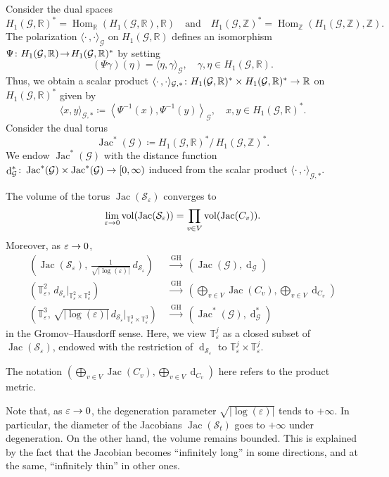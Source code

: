 \documentclass[AHL,Unicode,longabstracts]{cedram}
\newcommand{\innone}[2]{{\langle#2\rangle_{#1}}}
\newcommand{\binnone}[2]{{\left\langle#2\right\rangle_{#1}}}
\newcommand{\rest}[1]{\vert_{#1}}
\newcommand{\rquot}[2]{#1/\,#2}
\DeclareMathOperator{\Hom}{Hom}
\DeclareMathOperator{\Jac}{Jac}
\DeclareMathOperator{\vol}{vol}
\DeclareMathOperator{\dist}{d}
\newcommand{\R}{\mathbb{R}}
\newcommand{\Z}{\mathbb{Z}}
\newcommand{\T}{\mathbb{T}}
\newcommand{\mgr}{\mathcal{G}}
\newcommand{\rsf}{\mathcal{S}}
\newcommand{\GH}{\mathrm{GH}}
\renewcommand*{\to}{\mathchoice{\longrightarrow}{\rightarrow}{\rightarrow}{\rightarrow}}
\begin{document}
Consider the dual spaces
\[
H_1(\mgr, \R)^\ast = \Hom_\R(H_1(\mgr, \R), \R) \quad\text{and}\quad H_1(\mgr , \Z)^\ast = \Hom_\Z(H_1(\mgr, \Z), \Z).
\]
The polarization $\innone{\mgr}{\cdot \,, \cdot}$ on $H_1(\mgr, \R)$ defines an isomorphism $\Psi \colon H_1(\mgr, \R)\! \to\! H_1(\mgr, \R)^\ast$ by setting
\[
(\Psi\gamma)(\eta) = \innone{\mgr}{\eta, \gamma}, \quad \gamma, \eta\in H_1(\mgr, \R).
\]
Thus, we obtain a scalar product $\innone{\mgr, \ast}{\cdot \,, \cdot} \colon H_1(\mgr, \R)^\ast \times H_1(\mgr, \R)^\ast \to \R$ on $H_1(\mgr, \R)^\ast$ given by
\[
\innone{\mgr, \ast}{x,y}\coloneqq \binnone{\mgr}{\Psi^{-1}(x), \Psi^{-1}(y)}, \quad x,y \in H_1(\mgr, \R)^\ast.
\]
Consider the dual torus
\[
\Jac^\ast(\mgr) \coloneqq \rquot{H_1(\mgr, \R)^\ast}{H_1(\mgr, \Z)^\ast}.
\]
We endow $\Jac^\ast(\mgr) $ with the distance function $\dist_{\mgr}^\ast \colon \Jac^\ast(\mgr) \times \Jac^\ast(\mgr) \to [0, \infty)$ induced from the scalar product $\innone{\mgr, \ast}{\cdot \,, \cdot}$.


\begin{theo} \label{thm:RiemannSurfaceDegeneration}
The volume of the torus $\Jac(\rsf_\varepsilon)$ converges to
\[
\lim_{\varepsilon \to 0} \vol(\Jac(\rsf_\varepsilon)) = \prod_{v \in V} \vol(\Jac(C_v)).
\]
Moreover, as $\varepsilon \to 0$,
\begin{align*}
\left(\Jac(\rsf_\varepsilon), \, \frac{1}{\sqrt{|\log(\varepsilon)|}}\, d_{\rsf_\varepsilon} \right) \; &\xrightarrow{\GH} \; \left(\Jac(\mgr), \dist_{\mgr} \right) \\
\left(\T^2_\varepsilon, \, d_{\rsf_\varepsilon} \rest{\T^2_\varepsilon \times \T^2_\varepsilon}\right)\; &\xrightarrow{\GH} \; \left(\bigoplus_{v \in V} \Jac(C_v), \bigoplus_{v \in V} \dist_{C_v} \right) \\
\left(\T^3_\varepsilon, \, \sqrt{|\log(\varepsilon)|}\, d_{\rsf_\varepsilon}\rest{\T^3_\varepsilon \times \T^3_\varepsilon}\right) \; &\xrightarrow{\GH} \; \left(\Jac^\ast(\mgr), \dist_{\mgr}^\ast \right)
\end{align*}
in the Gromov--Hausdorff sense. Here, we view $\T^j_\varepsilon$ as a closed subset of $\Jac(\rsf_\varepsilon)$, endowed with the restriction of $\dist_{\rsf_\varepsilon}$ to $ \T^j_\varepsilon \times \T^j_\varepsilon$.
\end{theo}

The notation $ (\bigoplus_{v \in V} \Jac(C_v), \bigoplus_{v \in V} \dist_{C_v} )$ here refers to the product metric.

\begin{rema}
Note that, as $\varepsilon \to 0$, the degeneration parameter $\sqrt{|\log(\varepsilon)|}$ tends to $+ \infty$. In particular, the diameter of the Jacobians $\Jac(\rsf_t)$ goes to $+ \infty$ under degeneration. On the other hand, the volume remains bounded. This is explained by the fact that the Jacobian becomes ``infinitely long'' in some directions, and at the same, ``infinitely thin'' in other ones.%
\end{rema}
\end{document}

